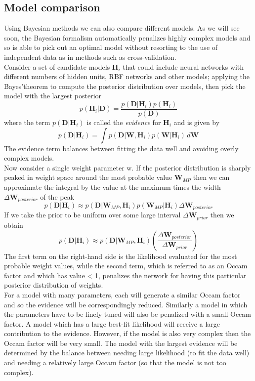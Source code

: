 \subsection{Model comparison}
 Using Bayesian methods we can also compare different models. As we will see soon, the Bayesian formalism automatically penalizes highly complex models and so is able to pick out an optimal model without resorting to the use of independent data as in methods such as cross-validation.\\
 Consider a set of candidate models $\textbf{H}_i$ that could include  neural networks with different numbers of hidden units, RBF networks and other models; applying the Bayes’theorem to compute the posterior  distribution over models, then pick the model with the largest posterior
 $$p(\textbf{H}_i|\textbf{D})= \frac{p(\textbf{D}|\textbf{H}_i) p(\textbf{H}_i)}{p(\textbf{D})}$$
 where the term $p(\textbf{D}|\textbf{H}_i)$ is called the \emph{evidence} for $\textbf{H}_i$ and is given by
 $$p(\textbf{D}|\textbf{H}_i)= \int p(\textbf{D}|\textbf{W}, \textbf{H}_i)p(\textbf{W}|\textbf{H}_i)\, d\textbf{W}$$ 
 The evidence term balances between ﬁtting the data well  and avoiding overly complex models.\\
 Now consider a single weight parameter w. If the posterior distribution is sharply peaked in weight space around the most probable value $\textbf{W}_{MP}$ then we can approximate the integral by the value at the maximum times the width $\Delta \textbf{W}_{posterior}$ of the peak
  $$p(\textbf{D}|\textbf{H}_i) \approx p(\textbf{D}|\textbf{W}_{MP}, \textbf{H}_i)p(\textbf{W}_{MP}|\textbf{H}_i)\Delta \textbf{W}_{posterior}$$
If we take the prior to be uniform over some large interval $\Delta \textbf{W}_{prior}$ then we obtain
$$p(\textbf{D}|\textbf{H}_i) \approx p(\textbf{D}|\textbf{W}_{MP}, \textbf{H}_i) (\frac{\Delta \textbf{W}_{posterior}}{\Delta \textbf{W}_{prior}})$$
The first term on the right-hand side is the likelihood evaluated for the most probable weight values, while the second term, which is referred to as an Occam factor and which has value < 1, penalizes the network for having this particular posterior distribution of weights.\\
For a model with many parameters, each will generate a similar Occam factor and so the evidence will be correspondingly reduced. Similarly a model in which the parameters have to be finely tuned will also be penalized with a small Occam factor. A model which has a large best-fit likelihood will receive a large contribution to the evidence. However, if the model is also very complex then the Occam factor will be very small. The model with the largest evidence will be determined by the balance between needing large likelihood (to fit the data well) and needing a relatively large Occam factor (so that the model is not too complex).
 
